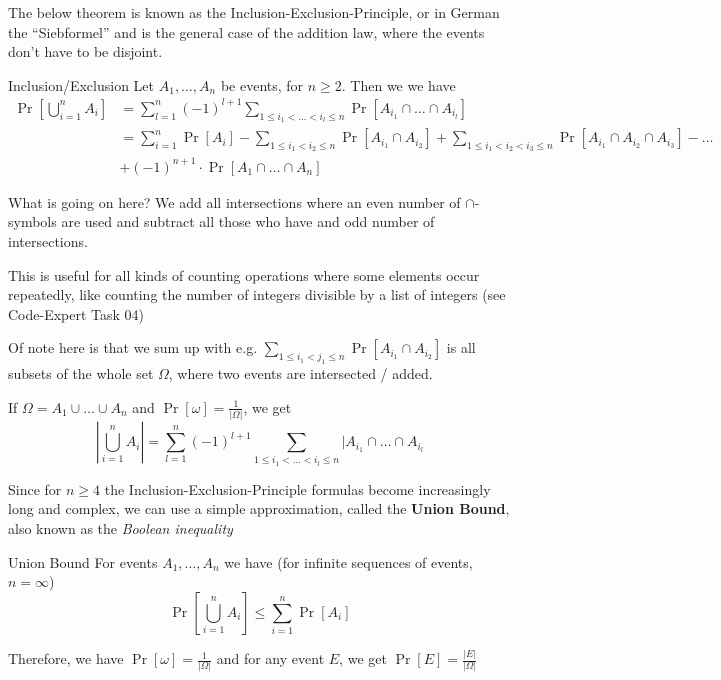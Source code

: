 \newpage
\label{sec:prob-basics}
\setcounter{all}{5}
The below theorem is known as the Inclusion-Exclusion-Principle, or in German the ``Siebformel'' and is the general case of the addition law, where the events don't have to be disjoint.
\begin{theorem}[]{Inclusion/Exclusion}
    Let $A_1, \ldots, A_n$ be events, for $n \geq 2$. Then we we have
    \begin{align*}
        \Pr\left[ \bigcup_{i = 1}^{n} A_i \right] & = \sum_{l = 1}^{n} (-1)^{l + 1} \sum_{1 \leq i_1 < \ldots < i_l \leq n} \Pr[A_{i_1} \cap \ldots \cap A_{i_l}] \\
                                                  & = \sum_{i = 1}^{n} \Pr[A_i] - \sum_{1 \leq i_1 < i_2 \leq n} \Pr[A_{i_1} \cap A_{i_2}]
        + \sum_{1\leq i_1 < i_2 < i_3 \leq n} \Pr[A_{i_1} \cap A_{i_2} \cap A_{i_3}] -\ldots                                                                      \\
                                                  & + (-1)^{n + 1} \cdot \Pr[A_1 \cap \ldots \cap A_n]
    \end{align*}
\end{theorem}

What is going on here? We add all intersections where an even number of $\cap$-symbols are used and subtract all those who have and odd number of intersections.

 This is useful for all kinds of counting operations where some elements occur repeatedly, like counting the number of integers divisible by a list of integers (see Code-Expert Task 04)

Of note here is that we sum up with e.g. $\displaystyle\sum_{1 \leq i_1 < j_1 \leq n} \Pr[A_{i_1} \cap A_{i_2}]$ is all subsets of the whole set $\Omega$, where two events are intersected / added.

If $\Omega = A_1 \cup \ldots \cup A_n$ and $\Pr[\omega] = \frac{1}{|\Omega|}$, we get
\[
    \left|\bigcup_{i = 1}^{n}A_i\right| = \sum_{l = 1}^{n} (-1)^{l + 1} \sum_{1 \leq i_1 < \ldots < i_l \leq n} |A_{i_1} \cap \ldots \cap A_{i_l}
\]

Since for $n \geq 4$ the Inclusion-Exclusion-Principle formulas become increasingly long and complex, we can use a simple approximation, called the \textbf{Union Bound}, also known as the \textit{Boolean inequality}

\begin{corollary}[]{Union Bound}
    For events $A_1, \ldots, A_n$ we have (for infinite sequences of events, $n = \infty$)
    \[
        \Pr\left[ \bigcup_{i = 1}^{n} A_i \right] \leq \sum_{i = 1}^{n} \Pr[A_i]
    \]
\end{corollary}

\vspace{1cm}
\begin{center}
\end{center}
\vspace{1cm}

Therefore, we have $\Pr[\omega] = \displaystyle \frac{1}{|\Omega|}$ and for any event $E$, we get $\displaystyle \Pr[E] = \frac{|E|}{|\Omega|}$
